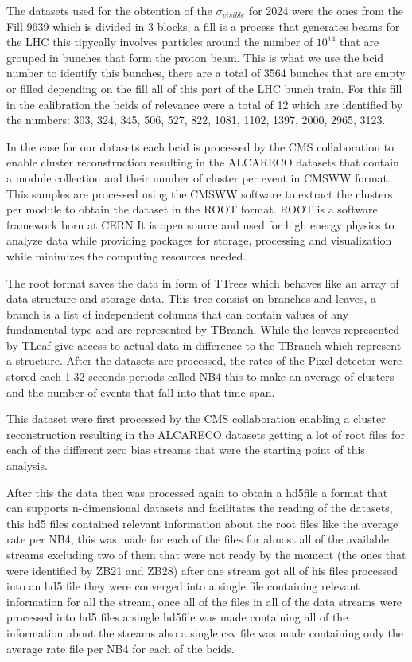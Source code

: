The datasets used for the obtention of the $\sigma_{visible}$ for 2024 were the ones from the Fill 9639 which is divided in 3 blocks, a fill is a process that generates beams for the LHC this tipycally involves particles around the number of $10^{14}$ that are grouped in bunches that form the proton beam. This is what we use the bcid number to identify this bunches, there are a total of 3564 bunches that are empty or filled depending on the fill all of this part of the LHC bunch train. For this fill in the calibration the bcids of relevance were a total of 12 which are identified by the numbers: 303, 324, 345, 506, 527, 822, 1081, 1102, 1397, 2000, 2965, 3123. 

In the case for our datasets each bcid is processed by the CMS collaboration to enable cluster reconstruction resulting in the ALCARECO datasets that contain a module collection and their number of cluster per event in CMSWW format. This samples are processed using the CMSWW software to extract the clusters per module to obtain the dataset in the ROOT format. ROOT is a software framework born at CERN It is open source and used for high energy physics to analyze data while providing packages for storage, processing and visualization while minimizes the computing resources needed. 

The root format saves the data in form of TTrees which behaves like an array of data structure and storage data. This tree consist on branches and leaves, a branch is a list of independent columns that can contain values of any fundamental type and are represented by TBranch. While the leaves represented by TLeaf give access to actual data in difference to the TBranch which represent a structure. After the datasets are processed, the rates of the Pixel detector were stored each 1.32 seconds periods called NB4 this to make an average of clusters and the number of events that fall into that time span. 

This dataset were first processed by the CMS collaboration enabling a cluster reconstruction resulting in the ALCARECO datasets getting a lot of root files for each of the different zero bias streams that were the starting point of this analysis. 

After this the data then was processed again to obtain a hd5file a format that can supports n-dimensional datasets and facilitates the reading of the datasets, this hd5 files contained relevant information about the root files like the average rate per NB4, this was made for each of the files for almost all of the available streams excluding two of them that were not ready by the moment (the ones that were identified by ZB21 and ZB28) after one stream got all of his files processed into an hd5 file they were converged into a single file containing relevant information for all the stream, once all of the files in all of the data streams were processed into hd5 files a single hd5file was made containing all of the information about the streams also a single csv file was made containing only the average rate file per NB4 for each of the bcids.  
 
